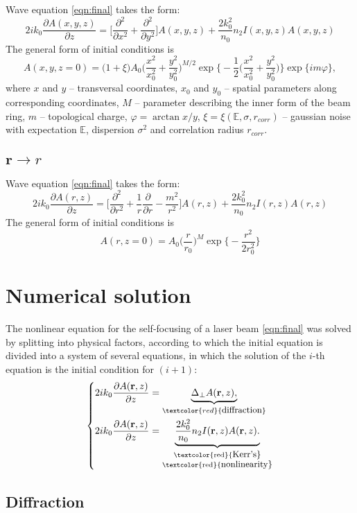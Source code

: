 \documentclass[a4paper, 12pt]{article}
\begin{document}
Wave equation \eqref{eqn:final} takes the form:
\begin{equation}
2 i k_0 \frac{\partial A (x, y, z)}{\partial z} = \biggl[ \frac{\partial^2}{\partial x^2} + \frac{\partial^2}{\partial y^2} \biggr] A (x, y, z) + \frac{2 k_0^2}{n_0} n_2 I(x, y, z) A(x, y, z)
\end{equation}
The general form of initial conditions is
\begin{equation}
A(x,y, z = 0) = \biggl(1 + \xi\biggr)A_0 \biggl(\frac{x^2}{x_0^2}+\frac{y^2}{y_0^2}\biggr)^{M/2}\exp\biggl\{-\frac1{2}\biggl(\frac{x^2}{x_0^2}+\frac{y^2}{y_0^2}\biggr)\biggr\}\exp\biggl\{i m \varphi\biggr\},
\end{equation}
where $x$ and $y$ -- transversal coordinates, $x_0$ and $y_0$ -- spatial parameters along corresponding coordinates, $M$ -- parameter describing the inner form of the beam ring, $m$ -- topological charge, $\varphi=\arctan{x/y}$, $\xi=\xi(\mathbb{E}, \sigma, r_{corr})$ -- gaussian noise with expectation $\mathbb{E}$, dispersion $\sigma^2$ and correlation radius $r_{corr}$.


\subsection{$\mathbf{r}\longrightarrow r$}

Wave equation \eqref{eqn:final} takes the form:
\begin{equation}
2 i k_0 \frac{\partial A (r, z)}{\partial z} = \biggl[ \frac{\partial^2}{\partial r^2} + \frac1{r}\frac{\partial}{\partial r} - \frac{m^2}{r^2} \biggr] A (r, z) + \frac{2 k_0^2}{n_0} n_2 I(r, z) A(r, z)
\end{equation}
The general form of initial conditions is
\begin{equation}
A(r,z=0) = A_0 \biggl( \frac{r}{r_0} \biggr)^M \exp \biggl\{ -\frac{r^2}{2r_0^2} \biggr\}
\end{equation}

\section{Numerical solution}

The nonlinear equation for the self-focusing of a laser beam \eqref{eqn:final} was solved by splitting into physical factors, according to which the initial equation is divided into a system of several equations, in which the solution of the $i$-th equation is the initial condition for $(i+1)$:
\begin{equation}
\left\{
\label{eqn:system}
\begin{split}
    2 i k_0  \frac{\partial A(\mathbf{r},z) }{\partial z}  &= \underbrace{\Delta_\perp A(\mathbf{r},z),}_{\textcolor{red}{\text{\small{diffraction}}}} \\
    2 i k_0  \frac{\partial A(\mathbf{r},z) }{\partial z} &= \underbrace{\frac{2 k_0^2}{n_0} n_2 I(\mathbf{r},z) A(\mathbf{r},z).}_{\substack{\text{\textcolor{red}{\small{Kerr's}}}\\\text{\textcolor{red}{\small{nonlinearity}}}}}
\end{split}
\right.
\end{equation}

\subsection{Diffraction}
\end{document}
